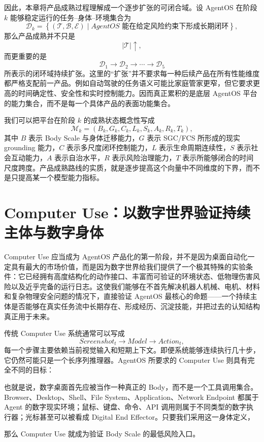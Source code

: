 因此，本章将产品成熟过程理解成一个逐步扩张的可闭合域。设 AgentOS 在阶段 $k$ 能够稳定运行的任务--身体--环境集合为
\[
\mathcal{D}_k
=
\left\{
(\mathcal{T},\mathcal{B},\mathcal{E})
\mid
AgentOS
\text{ 能在给定风险约束下形成长期闭环}
\right\},
\]
那么产品成熟并不只是
\[
|\mathcal{T}|\uparrow,
\]
而更重要的是
\[
\boxed{
\mathcal{D}_1
\rightarrow
\mathcal{D}_2
\rightarrow
\cdots
\rightarrow
\mathcal{D}_5
}
\]
所表示的闭环域持续扩张。这里的“扩张”并不要求每一种后续产品在所有性能维度都严格支配前一产品。例如自动驾驶的任务语义可能比家庭管家更窄，但它要求更高的时间确定性、安全性和实时控制能力。因而真正累积的是底层 AgentOS 平台的能力集合，而不是每一个具体产品的表面功能集合。

我们可以把平台在阶段 $k$ 的成熟状态概念性写成
\[
\mathcal{M}_k
=
\left(
B_k,
G_k,
C_k,
L_k,
S_k,
A_k,
R_k,
T_k
\right),
\]
其中 $B$ 表示 Body Scale 与身体迁移能力，$G$ 表示 SGC/FCS 所形成的现实 grounding 能力，$C$ 表示多尺度闭环控制能力，$L$ 表示生命周期连续性，$S$ 表示社会互动能力，$A$ 表示自治水平，$R$ 表示风险治理能力，$T$ 表示所能够闭合的时间尺度跨度。产品成熟路线的实质，就是逐步提高这个向量中不同维度的下界，而不是只提高某一个模型能力指标。

\section{Computer Use：以数字世界验证持续主体与数字身体}

Computer Use 应当成为 AgentOS 产品化的第一阶段，并不是因为桌面自动化一定具有最大的市场价值，而是因为数字世界给我们提供了一个极其特殊的实验条件：它已经拥有高度结构化的动作接口、丰富而可验证的环境状态、低物理伤害风险以及近乎完备的运行日志。这使我们能够在不首先解决机器人机械、电机、材料和复杂物理安全问题的情况下，直接验证 AgentOS 最核心的命题——一个持续主体是否能够在真实任务流中长期存在、形成经历、沉淀技能，并把过去的认知结构真正用于未来。

传统 Computer Use 系统通常可以写成
\[
Screenshot_t
\rightarrow
Model
\rightarrow
Action_t,
\]
每一个步骤主要依赖当前视觉输入和短期上下文。即便系统能够连续执行几十步，它仍然可能只是一个长序列推理器。AgentOS 所要求的 Computer Use 则具有完全不同的目标：
\begin{statementbox}
\centering
{}
\end{statementbox}
也就是说，数字桌面首先应被当作一种真正的 Body，而不是一个工具调用集合。Browser、Desktop、Shell、File System、Application、Network Endpoint 都属于 Agent 的数字现实环境；鼠标、键盘、命令、API 调用则属于不同类型的数字执行器；光标甚至可以被看成 Digital End Effector。只要我们采用这一身体定义，
\begin{statementbox}
\centering
{}
\end{statementbox}
那么 Computer Use 就成为验证 Body Scale 的最低风险入口。

